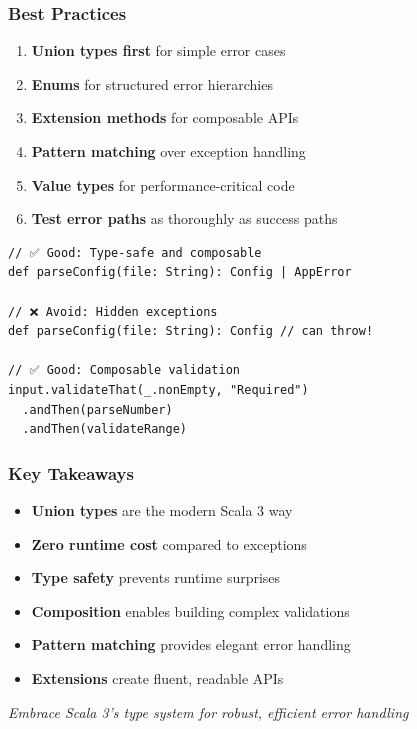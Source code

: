 \documentclass{beamer}
\begin{document}
\begin{frame}[fragile]
\frametitle{Best Practices}

\begin{enumerate}
\item \textbf{Union types first} for simple error cases
\item \textbf{Enums} for structured error hierarchies  
\item \textbf{Extension methods} for composable APIs
\item \textbf{Pattern matching} over exception handling
\item \textbf{Value types} for performance-critical code
\item \textbf{Test error paths} as thoroughly as success paths
\end{enumerate}

\begin{lstlisting}[style=scalaStyle]
// ✅ Good: Type-safe and composable
def parseConfig(file: String): Config | AppError

// ❌ Avoid: Hidden exceptions
def parseConfig(file: String): Config // can throw!

// ✅ Good: Composable validation
input.validateThat(_.nonEmpty, "Required")
  .andThen(parseNumber)
  .andThen(validateRange)
\end{lstlisting}

\end{frame}

\begin{frame}[fragile]
\frametitle{Key Takeaways}

\begin{itemize}
\item \textbf{Union types} are the modern Scala 3 way
\item \textbf{Zero runtime cost} compared to exceptions
\item \textbf{Type safety} prevents runtime surprises
\item \textbf{Composition} enables building complex validations
\item \textbf{Pattern matching} provides elegant error handling
\item \textbf{Extensions} create fluent, readable APIs
\end{itemize}

\vspace{1em}
\textit{Embrace Scala 3's type system for robust, efficient error handling}

\end{frame}
\end{document}
